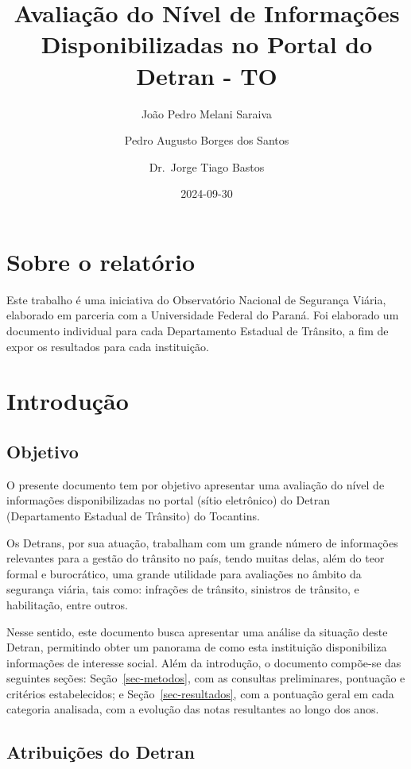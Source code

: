 \documentclass[
  a4paper,
]{article}
\title{Avaliação do Nível de Informações Disponibilizadas no Portal do
Detran - TO}
\author[1]{João Pedro Melani Saraiva}
\author[1]{Pedro Augusto Borges dos Santos}
\author[2]{Dr.~Jorge Tiago Bastos}
\affil[1]{Observatório Nacional de Segurança Viária}
\affil[2]{Universidade Federal do Paraná}
\date{2024-09-30}
\begin{document}
\maketitle

\section{Sobre o relatório}\label{sobre-o-relatuxf3rio}

Este trabalho é uma iniciativa do Observatório Nacional de Segurança
Viária, elaborado em parceria com a Universidade Federal do Paraná. Foi
elaborado um documento individual para cada Departamento Estadual de
Trânsito, a fim de expor os resultados para cada instituição.

\section{Introdução}\label{introduuxe7uxe3o}

\subsection{Objetivo}\label{objetivo}

O presente documento tem por objetivo apresentar uma avaliação do nível
de informações disponibilizadas no portal (sítio eletrônico) do Detran
(Departamento Estadual de Trânsito) do Tocantins.

Os Detrans, por sua atuação, trabalham com um grande número de
informações relevantes para a gestão do trânsito no país, tendo muitas
delas, além do teor formal e burocrático, uma grande utilidade para
avaliações no âmbito da segurança viária, tais como: infrações de
trânsito, sinistros de trânsito, e habilitação, entre outros.

Nesse sentido, este documento busca apresentar uma análise da situação
deste Detran, permitindo obter um panorama de como esta instituição
disponibiliza informações de interesse social. Além da introdução, o
documento compõe-se das seguintes seções: Seção~\ref{sec-metodos}, com
as consultas preliminares, pontuação e critérios estabelecidos; e
Seção~\ref{sec-resultados}, com a pontuação geral em cada categoria
analisada, com a evolução das notas resultantes ao longo dos anos.

\subsection{Atribuições do Detran}\label{atribuiuxe7uxf5es-do-detran}
\end{document}
